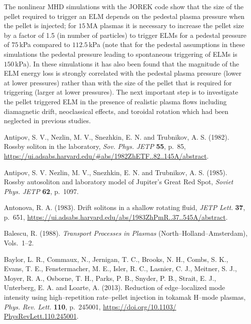 \documentclass[a4paper,openany,12pt]{book}
\begin{document}
{The nonlinear MHD simulations with the JOREK code show that the size of the pellet required to trigger an ELM depends on the pedestal plasma pressure when the pellet is injected; for $15\,$MA plasmas it is necessary to increase the pellet size by a factor of 1.5 (in number of particles) to trigger ELMs for a pedestal pressure of $75\,$kPa compared to $112.5\,$kPa (note that for the pedestal assumptions in these simulations the pedestal pressure leading to spontaneous triggering of ELMs is $150\,$kPa). In these simulations it has also been found that the magnitude of the ELM energy loss is strongly correlated with the pedestal plasma pressure (lower at lower pressures) rather than with the size of the pellet that is required for triggering (larger at lower pressures). The next important step is to investigate the pellet triggered ELM in the presence of realistic plasma flows including diamagnetic drift, neoclassical effects, and toroidal rotation which had been neglected in previous studies.

\begin{thebibliography}{100} 

\bibitem{}
Antipov, S. V., Nezlin,   M. V., Snezhkin, E. N. and Trubnikov, A. S. (1982).
Rossby soliton in the laboratory, {\em Sov. Phys. JETP} \textbf{55}, p.~85, \url{https://ui.adsabs.harvard.edu/#abs/1982ZhETF..82..145A/abstract}.

\bibitem{}
Antipov, S. V. Nezlin, M. V., Snezhkin, E. N. and Trubnikov, A. S. (1985). Rossby autosoliton and laboratory model of Jupiter's Great Red Spot,  {\em Soviet Phys. JETP} \textbf{62}, p.~1097.

\bibitem{}
Antonova, R. A. (1983). Drift solitons in a shallow rotating fluid, \emph{JETP Lett.} \textbf{37}, p.~651, \url{https://ui.adsabs.harvard.edu/abs/1983ZhPmR..37..545A/abstract}.

\bibitem{}
Balescu, R. (1988). \emph{Transport Processes in Plasmas} (North--Holland--Amsterdam), Vols.~1--2.

\bibitem{}
Baylor, L. R., Commaux, N., Jernigan, T. C., Brooks, N. H., Combs, S. K., Evans, T. E., Fenstermacher, M. E., Isler, R. C., Lasnier, C. J., Meitner, S. J., Moyer, R. A., Osborne, T. H., Parks, P. B., Snyder, P. B., Strait, E. J., Unterberg, E. A. and Loarte, A. (2013). Reduction of edge--localized mode intensity using high--repetition rate--pellet injection in tokamak H--mode plasmas, \emph{Phys. Rev. Lett.} \textbf{110}, p.~245001, \url{https://doi.org/10.1103/ PhysRevLett.110.245001}.


\end{thebibliography}}
\end{document}
